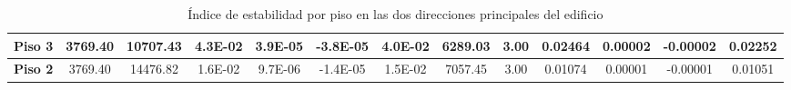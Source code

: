 \begin{table}[H]
{\begin{tabular}{|c|c|c|c|c|c|c|c|c|c|c|c|c|}
    \hline
    \rowcolor[rgb]{ .2,  .247,  .31} \textcolor[rgb]{ 1,  1,  1}{\textbf{Piso 3}} & \cellcolor[rgb]{ 1,  1,  1}3769.40 & \cellcolor[rgb]{ 1,  1,  1}10707.43 & \cellcolor[rgb]{ 1,  1,  1}4.3E-02 & \cellcolor[rgb]{ 1,  1,  1}3.9E-05 & \cellcolor[rgb]{ 1,  1,  1}-3.8E-05 & \cellcolor[rgb]{ 1,  1,  1}4.0E-02 & \cellcolor[rgb]{ 1,  1,  1}6289.03 & \cellcolor[rgb]{ 1,  1,  1}3.00 & \cellcolor[rgb]{ 1,  1,  1}0.02464 & \cellcolor[rgb]{ 1,  1,  1}0.00002 & \cellcolor[rgb]{ 1,  1,  1}-0.00002 & \cellcolor[rgb]{ 1,  1,  1}0.02252 \bigstrut\\
    \hline
    \rowcolor[rgb]{ .2,  .247,  .31} \textcolor[rgb]{ 1,  1,  1}{\textbf{Piso 2}} & \cellcolor[rgb]{ 1,  1,  1}3769.40 & \cellcolor[rgb]{ 1,  1,  1}14476.82 & \cellcolor[rgb]{ 1,  1,  1}1.6E-02 & \cellcolor[rgb]{ 1,  1,  1}9.7E-06 & \cellcolor[rgb]{ 1,  1,  1}-1.4E-05 & \cellcolor[rgb]{ 1,  1,  1}1.5E-02 & \cellcolor[rgb]{ 1,  1,  1}7057.45 & \cellcolor[rgb]{ 1,  1,  1}3.00 & \cellcolor[rgb]{ 1,  1,  1}0.01074 & \cellcolor[rgb]{ 1,  1,  1}0.00001 & \cellcolor[rgb]{ 1,  1,  1}-0.00001 & \cellcolor[rgb]{ 1,  1,  1}0.01051 \bigstrut\\
    \hline
    \end{tabular}}%
  \caption{Índice de estabilidad por piso en las dos direcciones principales del edificio}
  \label{tab:Indice de inestrabilidad}%
\end{table}%
